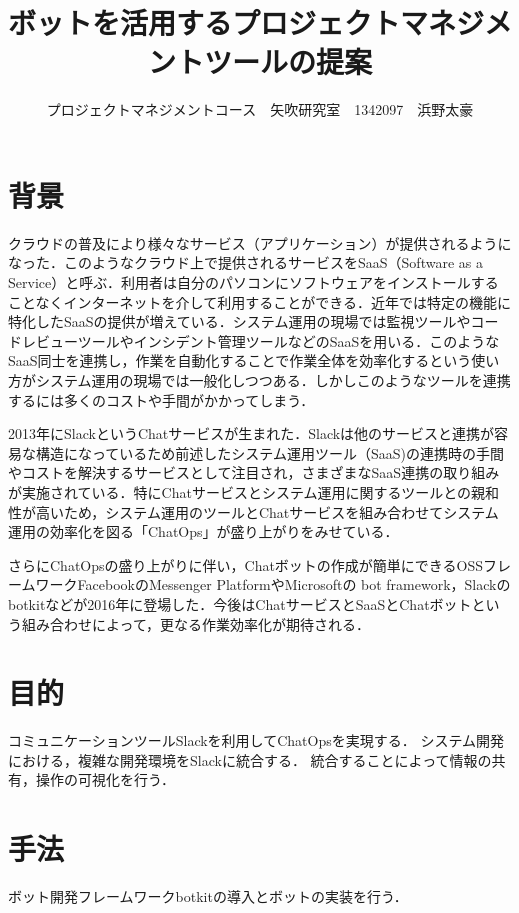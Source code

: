 \documentclass[uplatex,twocolumn,dvipdfmx]{jsarticle}
\title{\vspace{-5mm}\fontsize{14pt}{0pt}\selectfont ボットを活用するプロジェクトマネジメントツールの提案}
\author{\normalsize プロジェクトマネジメントコース　矢吹研究室　1342097　浜野太豪}
\date{}
\begin{document}
\fontsize{10.5pt}{\baselineskip}\selectfont
\maketitle





\section{背景}
クラウドの普及により様々なサービス（アプリケーション）が提供されるようになった．このようなクラウド上で提供されるサービスをSaaS（Software as a Service）と呼ぶ．利用者は自分のパソコンにソフトウェアをインストールすることなくインターネットを介して利用することができる\cite{saas}．近年では特定の機能に特化したSaaSの提供が増えている．システム運用の現場では監視ツールやコードレビューツールやインシデント管理ツールなどのSaaSを用いる．このようなSaaS同士を連携し，作業を自動化することで作業全体を効率化するという使い方がシステム運用の現場では一般化しつつある．しかしこのようなツールを連携するには多くのコストや手間がかかってしまう．

2013年にSlackというChatサービスが生まれた．Slackは他のサービスと連携が容易な構造になっているため\cite{slack}前述したシステム運用ツール（SaaS)の連携時の手間やコストを解決するサービスとして注目され，さまざまなSaaS連携の取り組みが実施されている．特にChatサービスとシステム運用に関するツールとの親和性が高いため，システム運用のツールとChatサービスを組み合わせてシステム運用の効率化を図る「ChatOps」が盛り上がりをみせている．

さらにChatOpsの盛り上がりに伴い，Chatボットの作成が簡単にできるOSSフレームワークFacebookのMessenger PlatformやMicrosoftの bot framework，Slackのbotkitなどが2016年に登場した．今後はChatサービスとSaaSとChatボットという組み合わせによって，更なる作業効率化が期待される．






\section{目的}
コミュニケーションツールSlackを利用してChatOpsを実現する．
システム開発における，複雑な開発環境をSlackに統合する．
統合することによって情報の共有，操作の可視化を行う．



\section{手法}
ボット開発フレームワークbotkitの導入とボットの実装を行う．
\end{document}
